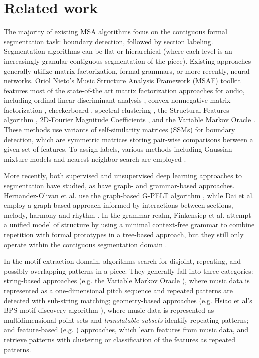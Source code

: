 \documentclass{article}
\begin{document}
\section{Related work}\label{sec:related_work}
The majority of existing MSA algorithms focus on the contiguous formal segmentation task: boundary detection, followed by section labeling. Segmentation algorithms can be flat or hierarchical (where each level is an increasingly granular contiguous segmentation of the piece). Existing approaches generally utilize matrix factorization, formal grammars, or more recently, neural networks. Oriol Nieto's Music Structure Analysis Framework (MSAF) toolkit \cite{msaf} features most of the state-of-the art matrix factorization approaches for audio, including ordinal linear discriminant analysis \cite{olda}, convex nonnegative matrix factorization \cite{cnmf}, checkerboard \cite{checkerboard}, spectral clustering \cite{scluster}, the Structural Features algorithm \cite{sf}, 2D-Fourier Magnitude Coefficients \cite{2dfmc}, and the Variable Markov Oracle \cite{vmo_segmentation}. These methods use variants of self-similarity matrices (SSMs) for boundary detection, which are symmetric matrices storing pair-wise comparisons between a given set of features. To assign labels, various methods including Gaussian mixture models and nearest neighbor search are employed \cite{msaf}. 

More recently, both supervised \cite{wang_2021} and unsupervised \cite{mccallum_2021, buisson_2022} deep learning approaches to segmentation have studied, as have graph- and grammar-based approaches. Hernandez-Olivan et al. use the graph-based G-PELT algorithm \cite{musicaiz}, while Dai et al. employ a graph-based approach informed by interactions between sections, melody, harmony and rhythm \cite{cmu_dannenberg_2020}. In the grammar realm, Finkensiep et al. attempt a unified model of structure by using a minimal context-free grammar to combine repetition with formal prototypes in a tree-based approach, but they still only operate within the contiguous segmentation domain \cite{repetition_grammars_ismir2023}. 

In the motif extraction domain, algorithms search for disjoint, repeating, and possibly overlapping patterns in a piece. They generally fall into three categories: string-based approaches (e.g. the Variable Markov Oracle \cite{vmo_motifs}), where music data is represented as a one-dimensional pitch sequence and repeated patterns are detected with sub-string matching; geometry-based approaches (e.g. Hsiao et al's BPS-motif discovery algorithm \cite{Hsiao_2023_motifs}), where music data is represented as multidimensional point sets and \textit{translatable subsets} identify repeating patterns; and feature-based (e.g. \cite{features_motifs}) approaches, which learn features from music data, and retrieve patterns with clustering or classification of the features as repeated patterns.
\end{document}
